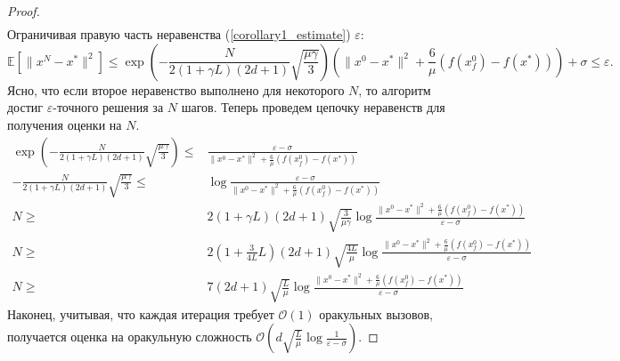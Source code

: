 \documentclass{article}
\begin{document}
\begin{proof}
\begin{align*}
\end{align*}
Ограничивая правую часть неравенства (\ref{corollary1_estimate}) $\varepsilon$:
\begin{equation}
   \mathbb{E}[\|x^N - x^*\|^2] \leqslant \exp\left(- \frac{N}{2 (1 + \gamma L) (2d + 1)}\sqrt{\frac{\mu\gamma}{3}}\right) \left(\|x^0 - x^*\|^2 + \frac{6}{\mu} (f(x_f^0) - f(x^*))\right) + \sigma \leqslant \varepsilon.
\end{equation}
Ясно, что если второе неравенство выполнено для некоторого $N$, то алгоритм достиг $\varepsilon$-точного решения за $N$ шагов. Теперь проведем цепочку неравенств для получения оценки на $N$.
\begin{align*}
    \exp\left(- \frac{N}{2 (1 + \gamma L) (2d + 1)}\sqrt{\frac{\mu\gamma}{3}}\right) \leqslant& \frac{\varepsilon - \sigma}{\|x^0 - x^*\|^2 + \frac{6}{\mu} (f(x_f^0) - f(x^*))}\\
    - \frac{N}{2 (1 + \gamma L) (2d + 1)}\sqrt{\frac{\mu\gamma}{3}} \leqslant& \log \frac{\varepsilon - \sigma}{\|x^0 - x^*\|^2 + \frac{6}{\mu} (f(x_f^0) - f(x^*))}\\
    N \geqslant& 2 (1 + \gamma L) (2d + 1) \sqrt{\frac{3}{\mu \gamma}} \log \frac{\|x^0 - x^*\|^2 + \frac{6}{\mu} (f(x_f^0) - f(x^*))}{\varepsilon - \sigma}\\
    N \geqslant& 2 \left(1 + \frac{3}{4L} L\right) (2d + 1) \sqrt{\frac{4L}{\mu}} \log \frac{\|x^0 - x^*\|^2 + \frac{6}{\mu} (f(x_f^0) - f(x^*))}{\varepsilon - \sigma}\\
    N \geqslant& 7(2d + 1) \sqrt{\frac{L}{\mu}} \log \frac{\|x^0 - x^*\|^2 + \frac{6}{\mu} (f(x_f^0) - f(x^*))}{\varepsilon - \sigma}
\end{align*}
Наконец, учитывая, что каждая итерация требует $\mathcal{O}(1)$ оракульных вызовов, получается оценка на оракульную сложность $\mathcal{O}\left(d \sqrt{\frac{L}{\mu}} \log \frac{1}{\varepsilon - \sigma}\right)$.
\end{proof}
\end{document}
